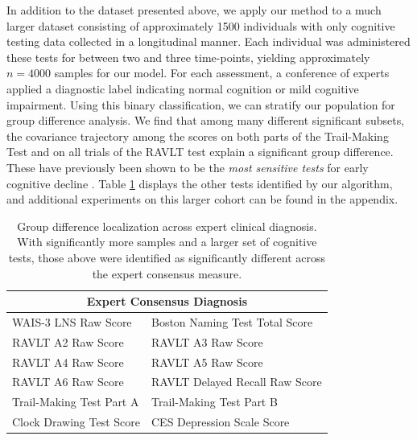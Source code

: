 In addition to the dataset presented above, we apply our method to a much larger dataset consisting of approximately 1500 individuals with only cognitive testing data collected in a longitudinal manner. Each individual was administered these tests for between two and three time-points, yielding approximately $n = 4000$ samples for our model. For each assessment, a conference of experts applied a diagnostic label indicating normal cognition or mild cognitive impairment. Using this binary classification, we can stratify our population for group difference analysis.
We find that among many different significant subsets, the covariance trajectory among the scores on both parts of the Trail-Making Test and 
on all trials of the RAVLT test explain a significant group difference. These have previously been shown to be the {\em most sensitive tests} for 
early cognitive decline \citep{albert2001preclinical}. 
Table \ref{tab:wrapCC} displays the other tests identified by our algorithm, and additional experiments on this larger cohort 
can be found in the appendix. 
%

\begin{table}
	\centering
	\begin{tabular}{ll}
		\toprule
		\multicolumn{2}{c}{\textbf{Expert Consensus Diagnosis}}\\ \midrule \midrule
		WAIS-3 LNS Raw Score &
		Boston Naming Test Total Score \\
		RAVLT A2 Raw Score &
		RAVLT A3 Raw Score \\
		RAVLT A4 Raw Score &
		RAVLT A5 Raw Score \\
		RAVLT A6 Raw Score &
		RAVLT Delayed Recall Raw Score \\
		Trail-Making Test Part A &
		Trail-Making Test Part B \\
		Clock Drawing Test Score &
		CES Depression Scale Score \\
		\bottomrule
		\bottomrule
	\end{tabular}
	\caption[Localized results across expert clinical diagnosis]{Group difference localization across expert clinical diagnosis. With significantly more samples and a larger set of cognitive tests, those above were identified as significantly different across the expert consensus measure.}
	\label{tab:wrapCC}
\end{table}

